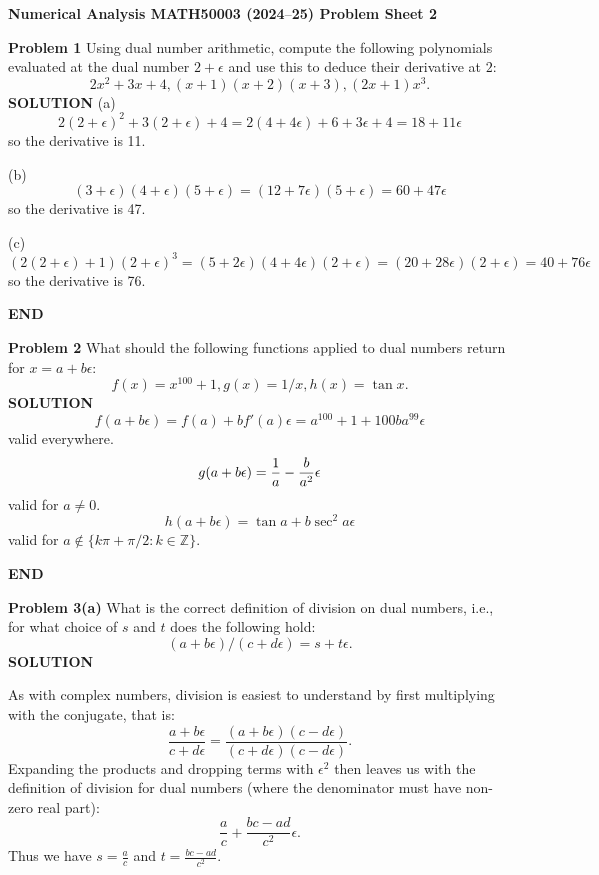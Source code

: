 \documentclass[12pt,a4paper]{article}
\def\endash{–}
\def\bbZ{ {\mathbb Z} }
\begin{document}
\textbf{Numerical Analysis MATH50003 (2024\ensuremath{\endash}25) Problem Sheet 2}

\textbf{Problem 1} Using dual number arithmetic, compute the following polynomials evaluated at the dual number $2+\ensuremath{\epsilon}$ and use this to deduce their derivative at $2$:
\[
2x^2 + 3x + 4, (x+1)(x+2)(x+3), (2x+1)x^3.
\]
\textbf{SOLUTION} (a)
\[
2(2+\ensuremath{\epsilon})^2 + 3(2+\ensuremath{\epsilon}) + 4 = 2(4+4\ensuremath{\epsilon}) + 6+3\ensuremath{\epsilon} + 4 = 18 + 11\ensuremath{\epsilon}
\]
so the derivative is 11.

(b) 
\[
(3+\ensuremath{\epsilon})(4+\ensuremath{\epsilon})(5+\ensuremath{\epsilon}) = (12+7\ensuremath{\epsilon})(5+\ensuremath{\epsilon}) = 60+47\ensuremath{\epsilon}
\]
so the derivative is 47.

(c)
\[
(2(2+\ensuremath{\epsilon})+1)(2+\ensuremath{\epsilon})^3 = 
(5+2\ensuremath{\epsilon})(4+4\ensuremath{\epsilon})(2+\ensuremath{\epsilon}) = 
(20 + 28\ensuremath{\epsilon})(2+\ensuremath{\epsilon}) = 40 + 76\ensuremath{\epsilon}
\]
so the derivative is 76.

\textbf{END}

\textbf{Problem 2} What should the following functions applied to dual numbers return for $x = a+b \ensuremath{\epsilon}$:
\[
f(x) = x^{100} + 1, g(x) = 1/x, h(x) = \tan x.
\]
\textbf{SOLUTION}
\[
f(a+ b\ensuremath{\epsilon}) = f(a) + b f'(a) \ensuremath{\epsilon} = a^{100} + 1 + 100ba^{99} \ensuremath{\epsilon}
\]
valid everywhere.
\[
g(a+ b\ensuremath{\epsilon}) =  {1 \over a} - {b \over a^2} \ensuremath{\epsilon}
\]
valid for $a \ensuremath{\neq} 0$.
\[
h(a+b\ensuremath{\epsilon}) = \tan a + b \sec^2 a \ensuremath{\epsilon}
\]
valid for $a \ensuremath{\notin} \{ k\ensuremath{\pi}+\ensuremath{\pi}/2 : k \ensuremath{\in} \ensuremath{\bbZ}\}$.

\textbf{END}

\textbf{Problem 3(a)} What is the correct definition of division on dual numbers, i.e., for what choice of $s$ and $t$ does the following hold:
\[
(a + b \ensuremath{\epsilon} )/(c + d \ensuremath{\epsilon} ) = s + t \ensuremath{\epsilon}.
\]
\textbf{SOLUTION}

As with complex numbers, division is easiest to understand by first multiplying with the conjugate, that is:
\[
\frac{a+b\ensuremath{\epsilon}}{c+d\ensuremath{\epsilon}} = \frac{(a+b\ensuremath{\epsilon})(c-d\ensuremath{\epsilon})}{(c+d\ensuremath{\epsilon})(c-d\ensuremath{\epsilon})}.
\]
Expanding the products and dropping terms with $\ensuremath{\epsilon}^2$ then leaves us with the definition of division for dual numbers (where the denominator must have non-zero real part):
\[
\frac{a}{c} + \frac{bc - ad}{c^2}\ensuremath{\epsilon}.
\]
Thus we have $s = \frac{a}{c}$ and $t = \frac{bc - ad}{c^2}$.
\end{document}
